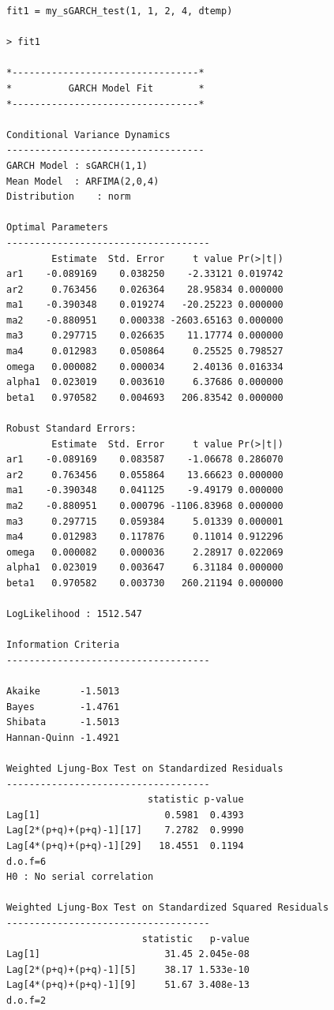 \documentclass[a4paper, 11pt]{article}
\begin{document}
\begin{verbatim}
fit1 = my_sGARCH_test(1, 1, 2, 4, dtemp)

> fit1

*---------------------------------*
*          GARCH Model Fit        *
*---------------------------------*

Conditional Variance Dynamics 	
-----------------------------------
GARCH Model	: sGARCH(1,1)
Mean Model	: ARFIMA(2,0,4)
Distribution	: norm 

Optimal Parameters
------------------------------------
        Estimate  Std. Error     t value Pr(>|t|)
ar1    -0.089169    0.038250    -2.33121 0.019742
ar2     0.763456    0.026364    28.95834 0.000000
ma1    -0.390348    0.019274   -20.25223 0.000000
ma2    -0.880951    0.000338 -2603.65163 0.000000
ma3     0.297715    0.026635    11.17774 0.000000
ma4     0.012983    0.050864     0.25525 0.798527
omega   0.000082    0.000034     2.40136 0.016334
alpha1  0.023019    0.003610     6.37686 0.000000
beta1   0.970582    0.004693   206.83542 0.000000

Robust Standard Errors:
        Estimate  Std. Error     t value Pr(>|t|)
ar1    -0.089169    0.083587    -1.06678 0.286070
ar2     0.763456    0.055864    13.66623 0.000000
ma1    -0.390348    0.041125    -9.49179 0.000000
ma2    -0.880951    0.000796 -1106.83968 0.000000
ma3     0.297715    0.059384     5.01339 0.000001
ma4     0.012983    0.117876     0.11014 0.912296
omega   0.000082    0.000036     2.28917 0.022069
alpha1  0.023019    0.003647     6.31184 0.000000
beta1   0.970582    0.003730   260.21194 0.000000

LogLikelihood : 1512.547 

Information Criteria
------------------------------------
                    
Akaike       -1.5013
Bayes        -1.4761
Shibata      -1.5013
Hannan-Quinn -1.4921

Weighted Ljung-Box Test on Standardized Residuals
------------------------------------
                         statistic p-value
Lag[1]                      0.5981  0.4393
Lag[2*(p+q)+(p+q)-1][17]    7.2782  0.9990
Lag[4*(p+q)+(p+q)-1][29]   18.4551  0.1194
d.o.f=6
H0 : No serial correlation

Weighted Ljung-Box Test on Standardized Squared Residuals
------------------------------------
                        statistic   p-value
Lag[1]                      31.45 2.045e-08
Lag[2*(p+q)+(p+q)-1][5]     38.17 1.533e-10
Lag[4*(p+q)+(p+q)-1][9]     51.67 3.408e-13
d.o.f=2


\end{verbatim}
\end{document}
